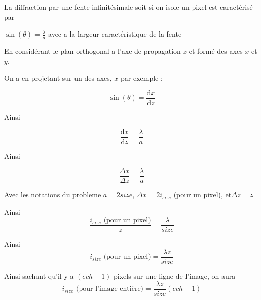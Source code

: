 \documentclass[10pt,a4paper]{article}
\begin{document}
La diffraction par une fente infinitésimale soit si on isole un pixel est caractérisé par  

$\sin(\theta)= \frac{\lambda}{a}$  avec a la largeur caractéristique de la fente 

En considérant le plan orthogonal a l’axe de propagation $z$ et formé des axes $x$ et $y$,   

On a en projetant sur un des axes, $x$ par exemple :

\[\sin(\theta)=\frac{\mathrm{d}x}{\mathrm{d}z}\]

Ainsi

\[\frac{\mathrm{d}x}{\mathrm{d}z}= \frac{\lambda}{a}\]

Ainsi

\[\frac{\Delta x}{\Delta z}= \frac{\lambda}{a}\]

Avec les notations du probleme $a=2size$, $\Delta x=2i_{size}$ (pour un pixel), et$\Delta z = z$

Ainsi 
\[\frac{i_{size}\text{ (pour un pixel)}}{z}=\frac{\lambda}{size}\]

Ainsi
\[i_{size}\text{ (pour un pixel)}=\frac{\lambda z}{size}\]

Ainsi sachant qu'il y a $(ech-1)$ pixels sur une ligne de l’image, on aura
\[i_{size}\text{ (pour l'image entière)}=\frac{\lambda z}{size}(ech-1)\]
\end{document}
